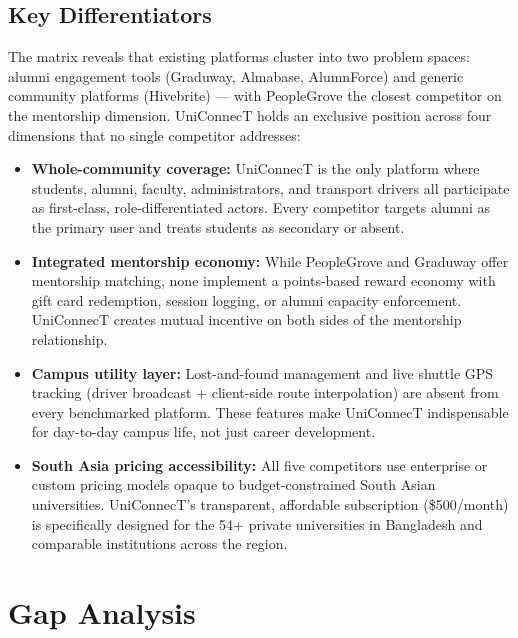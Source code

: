 \documentclass[12pt, a4paper]{article}
\begin{document}
\subsection{Key Differentiators}

The matrix reveals that existing platforms cluster into two problem spaces:
alumni engagement tools (Graduway, Almabase, AlumnForce) and generic community
platforms (Hivebrite) --- with PeopleGrove the closest competitor on the mentorship
dimension. UniConnecT holds an exclusive position across four dimensions that no
single competitor addresses:

\begin{itemize}
    \item \textbf{Whole-community coverage:} UniConnecT is the only platform where
    students, alumni, faculty, administrators, and transport drivers all participate
    as first-class, role-differentiated actors. Every competitor targets alumni as
    the primary user and treats students as secondary or absent.

    \item \textbf{Integrated mentorship economy:} While PeopleGrove and Graduway
    offer mentorship matching, none implement a points-based reward economy with gift
    card redemption, session logging, or alumni capacity enforcement. UniConnecT
    creates mutual incentive on both sides of the mentorship relationship.

    \item \textbf{Campus utility layer:} Lost-and-found management and live shuttle
    GPS tracking (driver broadcast + client-side route interpolation) are absent from
    every benchmarked platform. These features make UniConnecT indispensable for
    day-to-day campus life, not just career development.

    \item \textbf{South Asia pricing accessibility:} All five competitors use
    enterprise or custom pricing models opaque to budget-constrained South Asian
    universities. UniConnecT's transparent, affordable subscription (\$500/month)
    is specifically designed for the 54+ private universities in Bangladesh and
    comparable institutions across the region.
\end{itemize}
\clearpage
\section{Gap Analysis}
\end{document}
